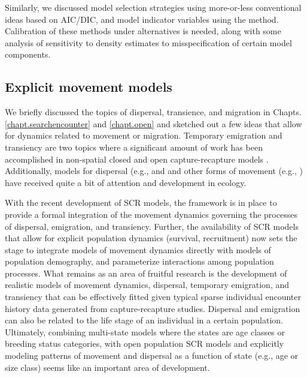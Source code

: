 Similarly, we discussed model selection strategies using more-or-less
conventional ideas based on AIC/DIC, and model indicator variables
using the \citet{kuo_mallick:1998} method. Calibration of these
methods under alternatives is needed, along with some analysis of
sensitivity to density estimates to misspecification of certain model
components.



\subsection{Explicit movement models}


We briefly discussed the topics of dispersal, transience, and
migration in Chapts. \ref{chapt.searchencounter} and \ref{chapt.open}
and sketched out a few ideas that allow for dynamics related to
movement or migration.  Temporary emigration and transiency are two
topics where a significant amount of work has been accomplished in
non-spatial closed and open capture-recapture models
\citep{kendall_etal:1997, pradel_hines:1997, hines_etal:2003,
  clavel_etal:2008, gilroy_etal:2012,chandler_etal:2011}.
Additionally, models for dispersal (e.g., \citet{clobert_etal:2001,
  ovaskainen:2004, ovaskainen_etal:2008} and and other forms of
movement (e.g., \cite{jonsen_etal:2005, johnson_etal:2008b,
  mcclintock_etal:2012}) have received quite a bit of attention and
development in ecology.

With the recent development of SCR models, the framework is in place
to provide a formal integration of the movement dynamics governing the
processes of dispersal, emigration, and transiency.  Further, the
availability of SCR models that allow for explicit population dynamics
(survival, recruitment) \citep{gardner_etal:2010ecol} now sets the
stage to integrate models of movement dynamics directly with models of
population demography, and parameterize interactions among population
processes. What remains as an area of fruitful research is the
development of realistic models of movement dynamics, dispersal,
temporary emigration, and transiency that can be effectively fitted
given typical sparse individual encounter history data generated from
capture-recapture studies.  Dispersal and emigration can also be
related to the life stage of an individual in a certain population.
Ultimately, combining multi-state models where the states are age
classes or breeding status categories, with open population SCR models
and explicitly modeling patterns of movement and dispersal as a
function of state (e.g., age or size class) seems like an important
area of development.



